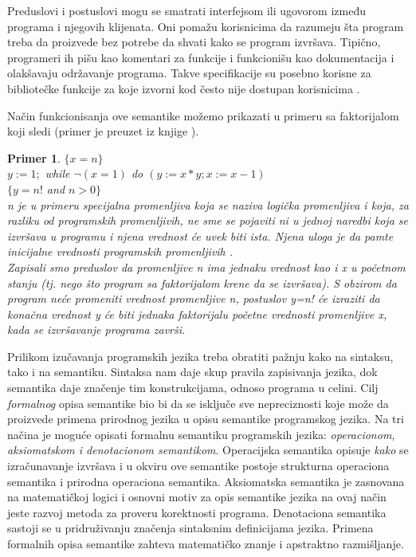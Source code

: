 \documentclass[a4paper]{article}
\newtheorem{primer}{Primer}[section]
\begin{document}
{Preduslovi i postuslovi mogu se smatrati interfejsom ili ugovorom između programa i njegovih klijenata. Oni pomažu korisnicima da razumeju šta program treba da proizvede bez potrebe da shvati kako se program izvršava. Tipično, programeri ih pišu kao komentari za funkcije i
funkcionišu kao dokumentacija i olakšavaju održavanje programa. Takve specifikacije su posebno
korisne za bibliotečke funkcije za koje izvorni kod često nije dostupan korisnicima \cite{adrian}.

Način funkcionisanja ove semantike možemo prikazati u primeru sa faktorijalom koji sledi (primer je preuzet iz knjige \cite{nielson} ). \\
\begin{primer}
$\{ x=n \} $ \\
$  y := 1; $
 while $ \neg(x=1) $  do $ (y := x*y; x := x-1) $\\
$ \{ y=n!$ and $ n > 0 \} $ \\

n je u primeru specijalna promenljiva koja se naziva logička promenljiva i koja, za razliku od programskih promenljivih, ne sme se pojaviti ni u jednoj naredbi koja se izvršava u programu i njena vrednost će uvek biti ista. Njena uloga je da pamte inicijalne vrednosti programskih promenljivih . \\
 Zapisali smo  preduslov da promenljive n ima jednaku vrednost kao i x u početnom stanju (tj. nego što program sa faktorijalom krene da se izvršava). S obzirom da program neće promeniti vrednost promenljive n, postuslov y=n! će izraziti da konačna vrednost y  će biti jednaka faktorijalu početne vrednosti promenljive x, kada se izvršavanje programa završi. \\

\end{primer}
Prilikom izučavanja programskih jezika treba obratiti pažnju kako na sintaksu, tako i na semantiku. Sintaksa nam daje skup pravila zapisivanja jezika, dok semantika daje značenje tim konstrukcijama, odnoso programa u celini. Cilj \textit{formalnog} opisa semantike bio bi da se isključe sve nepreciznosti koje može da proizvede primena prirodnog jezika u opisu semantike programskog jezika. Na tri načina je moguće opisati formalnu semantiku programskih jezika: \textit{operacionom, aksiomatskom  i  denotacionom semantikom}. Operacijska semantika opisuje \textit{kako} se izračunavanje izvršava i u okviru ove semantike postoje strukturna operaciona semantika i prirodna operaciona semantika. Aksiomatska semantika je zasnovana na matematičkoj logici i osnovni motiv za opis semantike jezika na ovaj način jeste razvoj metoda za proveru korektnosti programa. Denotaciona semantika sastoji se u pridruživanju značenja sintaksnim definicijama jezika. Primena formalnih opisa semantike zahteva matematičko znanje i apstraktno razmišljanje.


}
\end{document}
